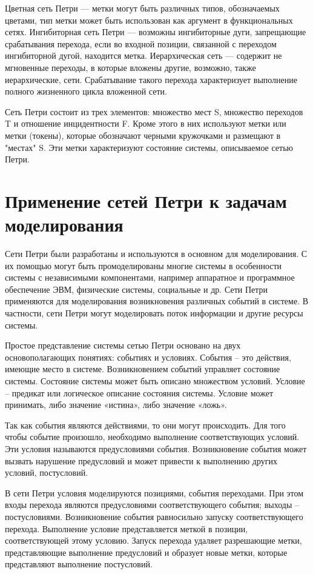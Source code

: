 Цветная сеть Петри — метки могут быть различных типов, обозначаемых цветами, тип метки может быть использован как аргумент в функциональных сетях. Ингибиторная сеть Петри — возможны ингибиторные дуги, запрещающие срабатывания перехода, если во входной позиции, связанной с переходом ингибиторной дугой, находится метка. Иерархическая сеть — содержит не мгновенные переходы, в которые вложены другие, возможно, также иерархические, сети. Срабатывание такого перехода характеризует выполнение полного жизненного цикла вложенной сети.

Сеть Петри состоит из трех элементов: множество мест S, множество переходов T и отношение инцидентности F. Кроме этого в них используют метки или метки (токены), которые обозначают черными кружочками и размещают в "местах" S. Эти метки характеризуют состояние системы, описываемое сетью Петри.

\section{Применение сетей Петри к задачам моделирования}

Сети Петри были разработаны и используются в основном для моделирования. С их помощью могут быть промоделированы многие системы в особенности системы с независимыми компонентами, например аппаратное и программное обеспечение ЭВМ, физические системы, социальные и др. Сети Петри применяются для моделирования возникновения различных событий в системе. В частности, сети Петри могут моделировать поток информации и другие ресурсы системы.

Простое представление системы сетью Петри основано на двух основополагающих понятиях: событиях и условиях. События – это действия, имеющие место в системе. Возникновением событий управляет состояние системы. Состояние системы может быть описано множеством условий. Условие – предикат или логическое описание состояния системы. Условие может принимать, либо значение «истина», либо значение «ложь».

Так как события являются действиями, то они могут происходить. Для того чтобы событие произошло, необходимо выполнение соответствующих условий. Эти условия называются предусловиями события. Возникновение события может вызвать нарушение предусловий и может привести к выполнению других условий, постусловий.

В сети Петри условия моделируются позициями, события переходами. При этом входы перехода являются предусловиями соответствующего события; выходы – постусловиями. Возникновение события равносильно запуску соответствующего перехода. Выполнение условие представляется меткой в позиции, соответствующей этому условию. Запуск перехода удаляет разрешающие метки, представляющие выполнение предусловий и образует новые метки, которые представляют выполнение постусловий.

